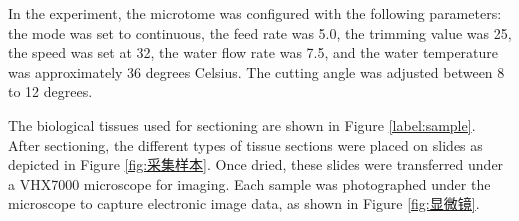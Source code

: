 



In the experiment, the microtome was configured with the following parameters: the mode was set to continuous, the feed rate was 5.0, the trimming value was 25, the speed was set at 32, the water flow rate was 7.5, and the water temperature was approximately 36 degrees Celsius. The cutting angle was adjusted between 8 to 12 degrees.

The biological tissues used for sectioning are shown in Figure \ref{label:sample}. After sectioning, the different types of tissue sections were placed on slides as depicted in Figure \ref{fig:采集样本}. Once dried, these slides were transferred under a VHX7000 microscope for imaging. Each sample was photographed under the microscope to capture electronic image data, as shown in Figure \ref{fig:显微镜}.

